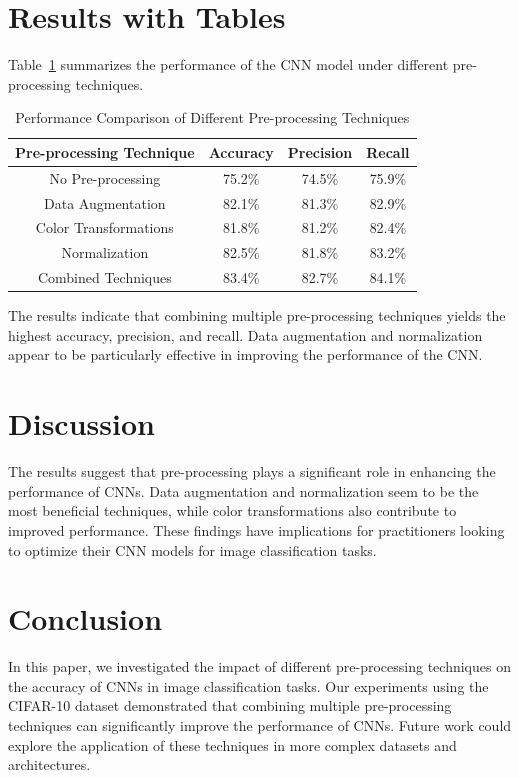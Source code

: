 \documentclass{article}
\begin{document}
\section{Results with Tables}
Table~\ref{tab:results} summarizes the performance of the CNN model under different pre-processing techniques.

\begin{table}[ht]
    \centering
    \begin{tabular}{|c|c|c|c|}
        \hline
        Pre-processing Technique & Accuracy & Precision & Recall \\
        \hline
        No Pre-processing & 75.2\% & 74.5\% & 75.9\% \\
        Data Augmentation & 82.1\% & 81.3\% & 82.9\% \\
        Color Transformations & 81.8\% & 81.2\% & 82.4\% \\
        Normalization & 82.5\% & 81.8\% & 83.2\% \\
        Combined Techniques & 83.4\% & 82.7\% & 84.1\% \\
        \hline
    \end{tabular}
    \caption{Performance Comparison of Different Pre-processing Techniques}
    \label{tab:results}
\end{table}

The results indicate that combining multiple pre-processing techniques yields the highest accuracy, precision, and recall. Data augmentation and normalization appear to be particularly effective in improving the performance of the CNN.

\section{Discussion}
The results suggest that pre-processing plays a significant role in enhancing the performance of CNNs. Data augmentation and normalization seem to be the most beneficial techniques, while color transformations also contribute to improved performance. These findings have implications for practitioners looking to optimize their CNN models for image classification tasks.

\section{Conclusion}
In this paper, we investigated the impact of different pre-processing techniques on the accuracy of CNNs in image classification tasks. Our experiments using the CIFAR-10 dataset demonstrated that combining multiple pre-processing techniques can significantly improve the performance of CNNs. Future work could explore the application of these techniques in more complex datasets and architectures.
\end{document}
